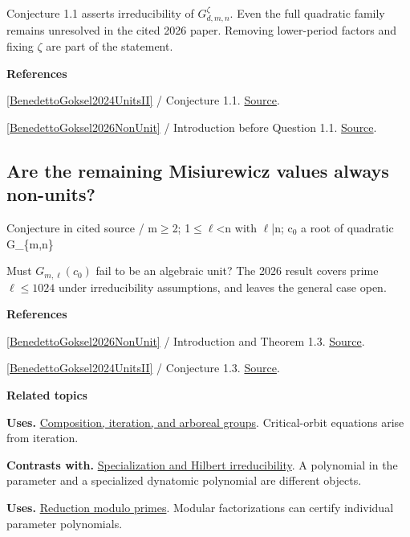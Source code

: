 \documentclass[11pt,a4paper,oneside,openany]{book}
\newenvironment{sources}{\par\smallskip\begingroup\footnotesize\color{atlasgray}\leftskip=10pt\setlength{\parskip}{2pt}}{\par\endgroup\smallskip}
\begin{document}
\color{black} Conjecture 1.1 asserts irreducibility of \(G_{d,m,n}^{\zeta}\). Even the full quadratic family remains unresolved in the cited 2026 paper. Removing lower-period factors and fixing \(\zeta\) are part of the statement.\par
\begin{sources}
\textbf{References}\par\smallskip
\noindent\hyperlink{ref:BenedettoGoksel2024UnitsII}{[BenedettoGoksel2024UnitsII]} / Conjecture 1.1.  \href{https://link.springer.com/article/10.1007/s40993-024-00539-0}{Source}.\par
\noindent\hyperlink{ref:BenedettoGoksel2026NonUnit}{[BenedettoGoksel2026NonUnit]} / Introduction before Question 1.1.  \href{https://doi.org/10.4064/aa250908-21-5}{Source}.\par
\end{sources}\color{black}
\subsection*{Are the remaining Misiurewicz values always non-units?}
{\small\sffamily\color{atlasgold}Conjecture in cited source / m\ensuremath{\ge}2; 1\ensuremath{\le}\ensuremath{\ell}<n with \ensuremath{\ell}|n; c\ensuremath{{}_0} a root of quadratic G\_\allowbreak{}\{m,n\}}\par\smallskip
\color{black} Must \(G_{m,\ell}(c_0)\) fail to be an algebraic unit? The 2026 result covers prime \(\ell\le1024\) under irreducibility assumptions, and leaves the general case open.\par
\begin{sources}
\textbf{References}\par\smallskip
\noindent\hyperlink{ref:BenedettoGoksel2026NonUnit}{[BenedettoGoksel2026NonUnit]} / Introduction and Theorem 1.3.  \href{https://doi.org/10.4064/aa250908-21-5}{Source}.\par
\noindent\hyperlink{ref:BenedettoGoksel2024UnitsII}{[BenedettoGoksel2024UnitsII]} / Conjecture 1.3.  \href{https://link.springer.com/article/10.1007/s40993-024-00539-0}{Source}.\par
\end{sources}\color{black}
\par\medskip\begingroup\footnotesize\setlength{\parskip}{1pt}\textbf{\sffamily\color{atlasgreen}Related topics}\par
\color{black}\textbf{Uses.} \hyperlink{article:composition-iteration}{Composition, iteration, and arboreal groups}. Critical-orbit equations arise from iteration.\par
\color{black}\textbf{Contrasts with.} \hyperlink{article:specialization}{Specialization and Hilbert irreducibility}. A polynomial in the parameter and a specialized dynatomic polynomial are different objects.\par
\color{black}\textbf{Uses.} \hyperlink{article:modular-irreducibility}{Reduction modulo primes}. Modular factorizations can certify individual parameter polynomials.\par
\endgroup
\end{document}
